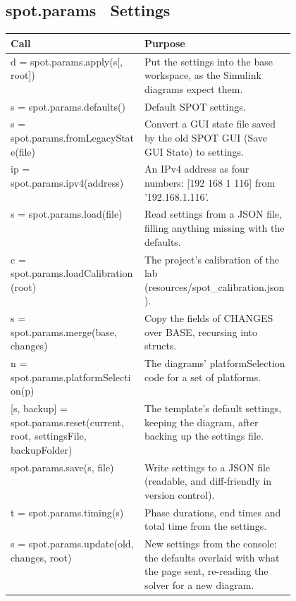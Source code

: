 \documentclass[11pt,a4paper]{article}
\begin{document}
\subsection*{spot.params \textmd{\textendash\ Settings}}
\begin{xltabular}{\linewidth}{@{}>{\raggedright\arraybackslash\ttfamily\footnotesize}p{0.47\linewidth} >{\raggedright\arraybackslash\small}X@{}}
\toprule \normalfont\small\textbf{Call} & \textbf{Purpose} \\ \midrule \endhead
d = spot.params.apply(s[, root]) & Put the settings into the base workspace, as the Simulink diagrams expect them. \\
s = spot.params.defaults() & Default SPOT settings. \\
s = spot.params.fromLegacyState(file) & Convert a GUI state file saved by the old SPOT GUI (Save GUI State) to settings. \\
ip = spot.params.ipv4(address) & An IPv4 address as four numbers: [192 168 1 116] from '192.168.1.116'. \\
s = spot.params.load(file) & Read settings from a JSON file, filling anything missing with the defaults. \\
c = spot.params.loadCalibration(root) & The project's calibration of the lab (resources/spot\_calibration.json). \\
s = spot.params.merge(base, changes) & Copy the fields of CHANGES over BASE, recursing into structs. \\
n = spot.params.platformSelection(p) & The diagrams' platformSelection code for a set of platforms. \\
{}[s, backup] = spot.params.reset(current, root, settingsFile, backupFolder) & The template's default settings, keeping the diagram, after backing up the settings file. \\
spot.params.save(s, file) & Write settings to a JSON file (readable, and diff-friendly in version control). \\
t = spot.params.timing(s) & Phase durations, end times and total time from the settings. \\
s = spot.params.update(old, changes, root) & New settings from the console: the defaults overlaid with what the page sent, re-reading the solver for a new diagram. \\
\bottomrule\end{xltabular}
\end{document}
